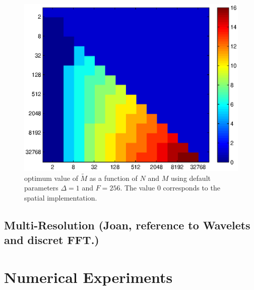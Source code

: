 \documentclass{article}
\begin{document}
\begin{figure}[ht]
\includegraphics[scale=0.48]{img/fftconvanalysis2.eps}
\caption{optimum value of $\tilde{M}$ as a function of $N$ and $M$ 
using default parameters $\Delta=1$ and $F=256$. The value $0$ 
corresponds to the spatial implementation.} 
\label{fftfig}
\end{figure}

\subsection{Multi-Resolution (Joan, reference to Wavelets and discret FFT.)}


\section{Numerical Experiments}
\end{document}
